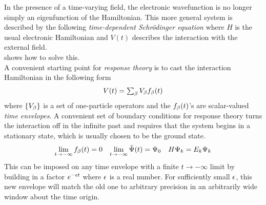 \documentclass[11pt]{article}
\numberwithin{equation}{section}
\begin{document}
\begin{rmk}
In the presence of a time-varying field, the electronic wavefunction is no longer simply an eigenfunction of the Hamiltonian.
This more general system is described by the following \textit{time-dependent Schr\"odinger equation}
where $H$ is the usual electronic Hamiltonian and $V(t)$ describes the interaction with the external field.\\
 shows how to solve this.\\
\label{rmk:time-envelopes}
A convenient starting point for \textit{response theory} is to cast the interaction Hamiltonian in the following form
\begin{align}
\label{eq:interaction-time-envelopes}
  V(t)
=
{\textstyle
  \sum_{\beta }
  V_{\beta }
  f_{\beta }(t)
}
\end{align}
where $\{V_{\beta }\}$ is a set of one-particle operators and the $f_{\beta }(t)$'s are scalar-valued \textit{time envelopes}.
A convenient set of boundary conditions for response theory turns the interaction off in the infinite past and requires that the system begins in a stationary state, which is usually chosen to be the ground state.
\begin{align}
  \lim_{t\rightarrow-\infty}
  f_{\beta }(t)
=
  0
&&
  \lim_{t\rightarrow-\infty}
  \tilde{\Psi }(t)
=
  \Psi _0
&&
  H
  \Psi _k
=
  E_k
  \Psi _k
\end{align}
This can be imposed on any time envelope with a finite $t\rightarrow-\infty$ limit by building in a factor $e^{-\epsilon  t}$ where $\epsilon $ is a real number.
For sufficiently small $\epsilon $, this new envelope will match the old one to arbitrary precision in an arbitrarily wide window about the time origin.
\end{rmk}
\end{document}
